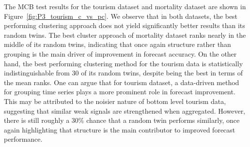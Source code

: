 \documentclass[a4paper,review,12pt,authoryear]{elsarticle}
\begin{document}
The MCB test results for the tourism dataset and mortality dataset are shown in Figure~\ref{fig:P3_tourism_c_vs_pc}.
We observe that in both datasets, the best performing clustering approach does not yield significantly better results than its random twins. 
The best cluster approach of mortality dataset ranks nearly in the middle of its random twins, indicating that once again structure rather than grouping is the main driver of improvement in forecast accuracy. 
On the other hand, the best performing clustering method for the tourism data is statistically indistinguishable from 30 of its random twins, despite being the best in terms of the mean ranks. One can argue that for tourism dataset, a data-driven method for grouping time series plays a more prominent role in forecast improvement. %
This may be attributed to the noisier nature of bottom level tourism data, suggesting that similar weak signals are strengthened when aggregated.
However, there is still roughly a 30\% chance that a random twin performs similarly, once again highlighting that structure is the main contributor to improved forecast performance.






\end{document}
